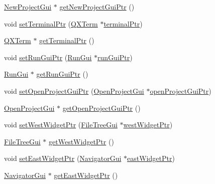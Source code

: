 \begin{DoxyCompactItemize}
\item 
\hyperlink{class_new_project_gui}{New\-Project\-Gui} $\ast$ \hyperlink{class_master_actions_a30b51649f46b8f105f8be5d9b4a6fb5f}{get\-New\-Project\-Gui\-Ptr} ()
\item 
void \hyperlink{class_master_actions_a78487f636588daf028a576b47703772e}{set\-Terminal\-Ptr} (\hyperlink{class_q_x_term}{Q\-X\-Term} $\ast$\hyperlink{class_master_actions_a540ec48ffb8bc7955f5630fac7b3865b}{terminal\-Ptr})
\item 
\hyperlink{class_q_x_term}{Q\-X\-Term} $\ast$ \hyperlink{class_master_actions_a1d6e583d7c6b63ca210ccc785e58c18d}{get\-Terminal\-Ptr} ()
\item 
void \hyperlink{class_master_actions_a67bf77b969dcbe752434110c8163d792}{set\-Run\-Gui\-Ptr} (\hyperlink{class_run_gui}{Run\-Gui} $\ast$\hyperlink{class_master_actions_ad7ff295f2e3067697e290afc4f0fd0df}{run\-Gui\-Ptr})
\item 
\hyperlink{class_run_gui}{Run\-Gui} $\ast$ \hyperlink{class_master_actions_a056278722ed1dbe98df15d1d073454bc}{get\-Run\-Gui\-Ptr} ()
\item 
void \hyperlink{class_master_actions_afc72dd08b2b6c8c25b8c4650b0446172}{set\-Open\-Project\-Gui\-Ptr} (\hyperlink{class_open_project_gui}{Open\-Project\-Gui} $\ast$\hyperlink{class_master_actions_a6caf7325dd9cb26f72c81a8c877db634}{open\-Project\-Gui\-Ptr})
\item 
\hyperlink{class_open_project_gui}{Open\-Project\-Gui} $\ast$ \hyperlink{class_master_actions_ab70b9336f1785ba7759b393d0b6a41db}{get\-Open\-Project\-Gui\-Ptr} ()
\item 
void \hyperlink{class_master_actions_a5e02bad0c35da48dcf7dc6a104d4a745}{set\-West\-Widget\-Ptr} (\hyperlink{class_file_tree_gui}{File\-Tree\-Gui} $\ast$\hyperlink{class_master_actions_a84f8a14213e1f05a00f1855b41a973de}{west\-Widget\-Ptr})
\item 
\hyperlink{class_file_tree_gui}{File\-Tree\-Gui} $\ast$ \hyperlink{class_master_actions_aae29be0bf5f9f2b8f1c7aac0c7efb288}{get\-West\-Widget\-Ptr} ()
\item 
void \hyperlink{class_master_actions_a983ce09c5c21c3cbf912472e878c7842}{set\-East\-Widget\-Ptr} (\hyperlink{class_navigator_gui}{Navigator\-Gui} $\ast$\hyperlink{class_master_actions_a24c61c608d67e766f996d3a430a7bae0}{east\-Widget\-Ptr})
\item 
\hyperlink{class_navigator_gui}{Navigator\-Gui} $\ast$ \hyperlink{class_master_actions_a863ab54858bacd76b50af788a6846e8e}{get\-East\-Widget\-Ptr} ()
\item 

\end{DoxyCompactItemize}
